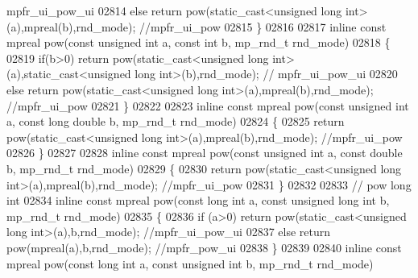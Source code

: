 \begin{DoxyCode}
{{{      mpfr\_ui\_pow\_ui}
02814     \textcolor{keywordflow}{else}    \textcolor{keywordflow}{return} pow(static\_cast<unsigned long int>(a),mpreal(b),rnd\_mode); \textcolor{comment}{//mpfr\_ui\_pow}
02815 \}
02816 
02817 \textcolor{keyword}{inline} \textcolor{keyword}{const} mpreal pow(\textcolor{keyword}{const} \textcolor{keywordtype}{unsigned} \textcolor{keywordtype}{int} a, \textcolor{keyword}{const} \textcolor{keywordtype}{int} b, mp\_rnd\_t rnd\_mode)
02818 \{
02819     \textcolor{keywordflow}{if}(b>0) \textcolor{keywordflow}{return} pow(static\_cast<unsigned long int>(a),static\_cast<unsigned long int>(b),rnd\_mode); \textcolor{comment}{//
      mpfr\_ui\_pow\_ui}
02820     \textcolor{keywordflow}{else}    \textcolor{keywordflow}{return} pow(static\_cast<unsigned long int>(a),mpreal(b),rnd\_mode); \textcolor{comment}{//mpfr\_ui\_pow}
02821 \}
02822 
02823 \textcolor{keyword}{inline} \textcolor{keyword}{const} mpreal pow(\textcolor{keyword}{const} \textcolor{keywordtype}{unsigned} \textcolor{keywordtype}{int} a, \textcolor{keyword}{const} \textcolor{keywordtype}{long} \textcolor{keywordtype}{double} b, mp\_rnd\_t rnd\_mode)
02824 \{
02825     \textcolor{keywordflow}{return} pow(static\_cast<unsigned long int>(a),mpreal(b),rnd\_mode); \textcolor{comment}{//mpfr\_ui\_pow}
02826 \}
02827 
02828 \textcolor{keyword}{inline} \textcolor{keyword}{const} mpreal pow(\textcolor{keyword}{const} \textcolor{keywordtype}{unsigned} \textcolor{keywordtype}{int} a, \textcolor{keyword}{const} \textcolor{keywordtype}{double} b, mp\_rnd\_t rnd\_mode)
02829 \{
02830     \textcolor{keywordflow}{return} pow(static\_cast<unsigned long int>(a),mpreal(b),rnd\_mode); \textcolor{comment}{//mpfr\_ui\_pow}
02831 \}
02832 
02833 \textcolor{comment}{// pow long int}
02834 \textcolor{keyword}{inline} \textcolor{keyword}{const} mpreal pow(\textcolor{keyword}{const} \textcolor{keywordtype}{long} \textcolor{keywordtype}{int} a, \textcolor{keyword}{const} \textcolor{keywordtype}{unsigned} \textcolor{keywordtype}{long} \textcolor{keywordtype}{int} b, mp\_rnd\_t rnd\_mode)
02835 \{
02836     \textcolor{keywordflow}{if} (a>0) \textcolor{keywordflow}{return} pow(static\_cast<unsigned long int>(a),b,rnd\_mode); \textcolor{comment}{//mpfr\_ui\_pow\_ui}
02837     \textcolor{keywordflow}{else}     \textcolor{keywordflow}{return} pow(mpreal(a),b,rnd\_mode); \textcolor{comment}{//mpfr\_pow\_ui}
02838 \}
02839 
02840 \textcolor{keyword}{inline} \textcolor{keyword}{const} mpreal pow(\textcolor{keyword}{const} \textcolor{keywordtype}{long} \textcolor{keywordtype}{int} a, \textcolor{keyword}{const} \textcolor{keywordtype}{unsigned} \textcolor{keywordtype}{int} b, mp\_rnd\_t rnd\_mode)
}}
\end{DoxyCode}

